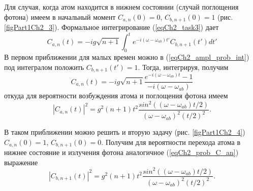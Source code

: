 

Для случая, когда атом находится в нижнем состоянии (случай поглощения
фотона) имеем в начальный момент  
$C_{a, n}\left(0\right) = 0$, $C_{b, n + 1}\left(0\right) = 1$
(рис. \ref{figPart1Ch2_3}). Формальное интегрирование (\ref{eqCh2_task3}) дает  
\begin{equation}
C_{a,n}\left(t\right) = -i g \sqrt{n + 1}
\int_0^t e^{-i \left(\omega - \omega_{ab}\right)t'} 
C_{b, n + 1}\left(t'\right) dt'
\label{eqCh2_ampl_prob_int}
\end{equation}
В первом приближении для малых времен можно в
(\ref{eqCh2_ampl_prob_int}) под интегралом 
положить $C_{b, n + 1}\left(t'\right) = 1$.  Тогда, интегрируя,
получим  
\begin{equation}
C_{a,n}\left(t\right) = -i g \sqrt{n + 1}
\frac{e^{-i \left(\omega - \omega_{ab}\right)t} - 1}
{-i \left(\omega - \omega_{ab}\right)}
\end{equation}
откуда для вероятности возбуждения атома и поглощения фотона имеем
\begin{equation}
\left|C_{a,n}\left(t\right)\right|^2 = g^2 \left(n + 1\right) t^2
\frac{sin^2\left(\left(\omega - \omega_{ab}\right)t/2\right)}
{\left(\omega - \omega_{ab}\right)^2\left(t/2\right)^2}. 
\label{eqCh2_prob_C_an}
\end{equation}



В таком приближении можно решить и вторую задачу (рис. \ref{figPart1Ch2_4}) 
$C_{a, n}\left(0\right) = 1$, $C_{b, n + 1}\left(0\right) = 0$. 
Получим для вероятности перехода атома в нижнее состояние и излучения
фотона аналогичное (\ref{eqCh2_prob_C_an}) выражение  
\begin{equation}
\left|C_{b, n + 1}\left(t\right)\right|^2 = g^2 \left(n + 1\right) t^2
\frac{sin^2\left(\left(\omega - \omega_{ab}\right)t/2\right)}
{\left(\omega - \omega_{ab}\right)^2\left(t/2\right)^2}.
\label{eqCh2_prob_C_bn}
\end{equation}

